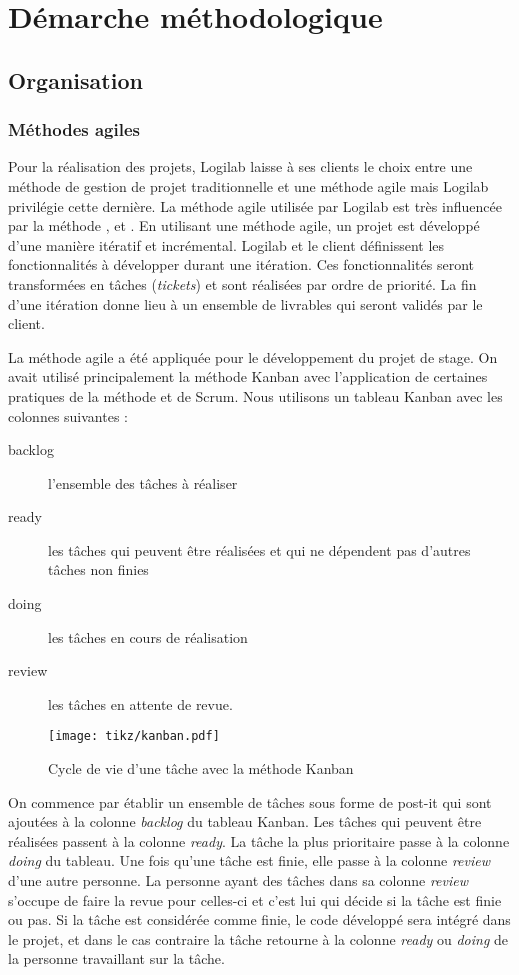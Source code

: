 \chapter{Démarche méthodologique} 
\section{Organisation} 
\subsection{Méthodes agiles} 
Pour la réalisation des projets, Logilab laisse à ses clients le choix
entre une méthode de gestion de projet traditionnelle et une méthode agile mais
Logilab privilégie cette dernière. La méthode agile utilisée par Logilab est
très influencée par la méthode , 
et . En utilisant une méthode agile, un projet est
développé d'une manière itératif et incrémental. Logilab et le client
définissent les fonctionnalités à développer durant une itération. Ces
fonctionnalités seront transformées en tâches (\textit{tickets}) et sont
réalisées par ordre de priorité. La fin d'une itération donne lieu à un
ensemble de livrables qui seront validés par le client. 

La méthode agile a été appliquée pour le développement du projet de stage. On
avait utilisé principalement la méthode Kanban avec l'application de certaines
pratiques de la méthode  et de Scrum. Nous utilisons un tableau
Kanban avec les colonnes suivantes : 

\begin{description} 
    \item[backlog] l'ensemble des tâches à réaliser 
    \item[ready] les tâches qui peuvent être réalisées et qui ne dépendent pas 
        d'autres tâches non finies
    \item[doing] les tâches en cours de réalisation 
    \item[review] les tâches en attente de revue.  
\end{description} 

\begin{figure} 
    \centering
    \texttt{[image: tikz/kanban.pdf]} 
    \caption{Cycle de vie d'une tâche avec la méthode Kanban} 
    \label{fig:kanban} 
\end{figure}
        
On commence par établir un ensemble de tâches sous forme de post-it qui sont 
ajoutées à la colonne \textit{backlog} du tableau Kanban. Les tâches qui peuvent 
être réalisées passent à la colonne \textit{ready}. La tâche la plus prioritaire 
passe à la colonne \textit{doing} du tableau. Une fois qu'une tâche est finie, 
elle passe à la colonne \textit{review} d'une autre personne. La personne ayant 
des tâches dans sa colonne \textit{review} s'occupe de faire la revue pour 
celles-ci et c'est lui qui décide si la tâche est finie ou pas. Si la tâche est
considérée comme finie, le code développé sera intégré dans le projet, et dans 
le cas contraire la tâche retourne à la colonne \textit{ready} ou \textit{doing} 
de la personne travaillant sur la tâche. 

